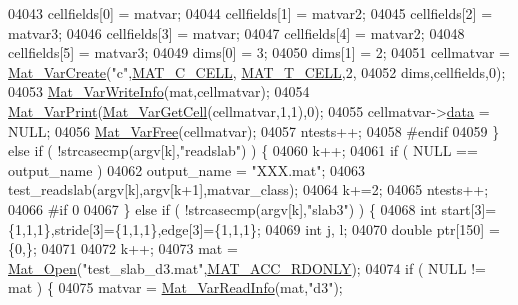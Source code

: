 \begin{DoxyCode}
{{{{{{{{{{{{{{{{{{{{{{{{{{{{{{{{{{{{{{{{{{{{{{{{{{{{{{{{{{{{{{{{{{{{04043                 cellfields[0] = matvar;
04044                 cellfields[1] = matvar2;
04045                 cellfields[2] = matvar3;
04046                 cellfields[3] = matvar;
04047                 cellfields[4] = matvar2;
04048                 cellfields[5] = matvar3;
04049                 dims[0] = 3;
04050                 dims[1] = 2;
04051                 cellmatvar = \hyperlink{group___m_a_t_ga1c54a84bb4d810c6fccdb8869489eac4}{Mat\_VarCreate}(\textcolor{stringliteral}{"c"},\hyperlink{group___m_a_t_ggad4d60ae7b709fc81bfd744fb4c857c40a2f7abb47a1c51e248bd4e5e03cc81b08}{MAT\_C\_CELL},
      \hyperlink{group___m_a_t_ggacf7b3b879282b7ab3a51190e49bf3453a07599cf2cca6d2b2d059378563318ba5}{MAT\_T\_CELL},2,
04052                                dims,cellfields,0);
04053                 \hyperlink{group___m_a_t_ga1ae164415dfd98cdf48ad07033b6e0bb}{Mat\_VarWriteInfo}(mat,cellmatvar);
04054                 \hyperlink{group___m_a_t_ga9100c145e338b84b55d5d0795d5d390a}{Mat\_VarPrint}(\hyperlink{group___m_a_t_gac1e15063439c0bd3eb0c986514c742dc}{Mat\_VarGetCell}(cellmatvar,1,1),0);
04055                 cellmatvar->\hyperlink{group___m_a_t_a5672978efa230bbdecdf38ede781f7fa}{data} = NULL;
04056                 \hyperlink{group___m_a_t_ga1d14716f7450530fd1c9d02413787f0e}{Mat\_VarFree}(cellmatvar);
04057             ntests++;
04058 \textcolor{preprocessor}{    #endif}
04059         \} \textcolor{keywordflow}{else} \textcolor{keywordflow}{if} ( !strcasecmp(argv[k],\textcolor{stringliteral}{"readslab"}) ) \{
04060             k++;
04061             \textcolor{keywordflow}{if} ( NULL == output\_name )
04062                 output\_name = \textcolor{stringliteral}{"XXX.mat"};
04063             test\_readslab(argv[k],argv[k+1],matvar\_class);
04064             k+=2;
04065             ntests++;
04066 \textcolor{preprocessor}{    #if 0}
04067         \} \textcolor{keywordflow}{else} \textcolor{keywordflow}{if} ( !strcasecmp(argv[k],\textcolor{stringliteral}{"slab3"}) ) \{
04068             \textcolor{keywordtype}{int}   start[3]=\{1,1,1\},stride[3]=\{1,1,1\},edge[3]=\{1,1,1\};
04069             \textcolor{keywordtype}{int} j, l;
04070             \textcolor{keywordtype}{double} ptr[150] = \{0,\};
04071 
04072             k++;
04073             mat = \hyperlink{group___m_a_t_gafbfedb5636a99f0ef867520c47f77d18}{Mat\_Open}(\textcolor{stringliteral}{"test\_slab\_d3.mat"},\hyperlink{group___m_a_t_ggaa9dcbc70f538af79bd557593ff6b5cdba8dd1457651b27ba9bea6cfba158c037c}{MAT\_ACC\_RDONLY});
04074             \textcolor{keywordflow}{if} ( NULL != mat ) \{
04075                 matvar = \hyperlink{group___m_a_t_ga46da2e45ed96d3f1a6ec643757f2b086}{Mat\_VarReadInfo}(mat,\textcolor{stringliteral}{"d3"});
}}}}}}}}}}}}}}}}}}}}}}}}}}}}}}}}}}}}}}}}}}}}}}}}}}}}}}}}}}}}}}}}}}}}
\end{DoxyCode}
